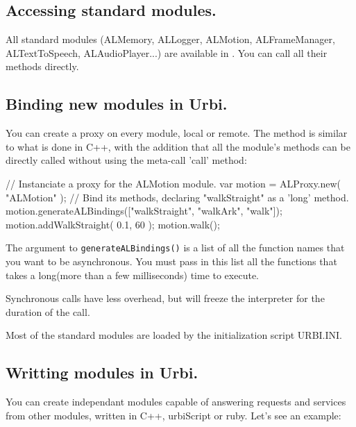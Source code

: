 \subsection{Accessing standard \naoqi modules.}

All standard \naoqi modules (ALMemory, ALLogger, ALMotion, ALFrameManager,
ALTextToSpeech, ALAudioPlayer...) are available in \urbi. You can call all
their methods directly.

\subsection{Binding new \naoqi modules in Urbi.}

You can create a proxy on every \naoqi module, local or remote.
The method is similar to what is done in C++, with the addition that all the
module's methods can be directly called without using the meta-call 'call'
method:

\begin{urbiunchecked}
// Instanciate a proxy for the ALMotion module.
var motion = ALProxy.new( "ALMotion" );
// Bind its methods, declaring "walkStraight" as a 'long' method.
motion.generateALBindings(["walkStraight", "walkArk", "walk"]);
motion.addWalkStraight( 0.1, 60 );
motion.walk();
\end{urbiunchecked}

The argument to \lstinline|generateALBindings()| is a list of all the function
names that you want to be asynchronous. You must pass in this list
all the functions that takes a long(more than a few milliseconds)
time to execute.

Synchronous calls have less overhead, but will freeze the \us
interpreter for the duration of the call.

Most of the standard modules are loaded by the initialization script URBI.INI.

\subsection{Writting \naoqi modules in Urbi.}

You can create independant modules capable of answering requests and services
from other \naoqi modules, written in C++, urbiScript or ruby. Let's see an
example:

